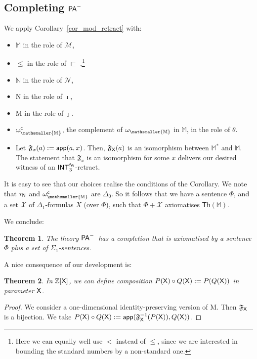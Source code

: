 \documentclass{amsart}
\renewcommand{\leq}{\leqslant}
\renewcommand{\Phi}{\varPhi}
\newtheorem{theorem}{Theorem}[section]
\newcommand{\mc}[1]{\mathcal #1}
\newcommand{\mf}[1]{{\mathfrak {#1}}}
\newcommand{\pam}{\ensuremath{{\sf PA}^{-}}}
\newcommand{\belowz}{\sqsubset}
\newcommand{\X}{{\sf X}}
\newcommand{\mbbs}[1]{\ensuremath{\mathsmaller{\mathbb{#1}}}}
\begin{document}
\subsection{Completing \pam}
We  apply Corollary~\ref{cor_mod_retract} with:
\begin{itemize}
    \item 
$\mathbb M$ in the role of $\mc M$, 
\item 
$\leq$ in the role of $\belowz$ ,\footnote{Here we can equally well use $<$ instead of $\leq$, since we are interested in bounding the standard numbers by a non-standard one.}  
\item 
$\mathbb N$ in the role of
$\mc N$, 
\item 
{\sf N} in the role of $\imath$,
\item 
{\sf M} in the role of $\jmath$. 
\item
$\omega_{\mbbs M}^{\sf c}$, the complement of $\omega_{\mbbs M}$ in $\mathbb M$, in the role of $\theta$.
\item 
Let $\mf F_{x}(a) := {\sf app}(a,x)$. Then, $\mf F_{\X}(a)$  is an isomorphism between
$\mathbb M^\ast$ and $\mathbb M$. The statement that $\mf F_x$ is an isomorphism
for some $x$ delivers our desired witness of an ${\sf INT}^{\sf fw}_3$-retract.
\end{itemize}

It is easy to see that our choices realise the conditions of the Corollary.
We note that $\tau_{\sf N}$ and $\omega_{\mbbs M}^{\sf c}$ are $\Delta_0$.
So it follows that we have a sentence $\Phi$, and a set $\mc X$
of $\Delta_1$-formulas $X$  (over $\Phi$), such 
that $\Phi + \mc X$ axiomatises  $\mathsf{Th}(\mathbb{M})$.

We conclude:

\begin{theorem}\label{uitslagsmurf}
    The theory \pam\ has a completion that is axiomatised by a sentence $\Phi$ plus a set of $\Sigma_1$-sentences. 
\end{theorem}

A nice consequence of our development is:
\begin{theorem}
    In $\mathbb Z[\X]$, we can define composition $P(\X) \circ Q(\X) := P(Q(\X))$ in parameter $\X$.
\end{theorem}

\begin{proof}
    We consider a one-dimensional identity-preserving version of {\sf M}. Then $\mf F_{\X}$ is a bijection.
    We take $P(\X)\circ Q(\X) := {\sf app}(\mf F^{-1}_{\X}(P(\X)),Q(\X))$.
\end{proof}
\end{document}
